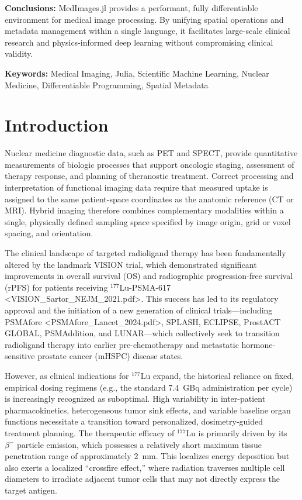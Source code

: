 \documentclass[10pt,letterpaper]{article}
\begin{document}
\textbf{Conclusions:} MedImages.jl provides a performant, fully differentiable environment for medical image processing. By unifying spatial operations and metadata management within a single language, it facilitates large-scale clinical research and physics-informed deep learning without compromising clinical validity.

\textbf{Keywords:} Medical Imaging, Julia, Scientific Machine Learning, Nuclear Medicine, Differentiable Programming, Spatial Metadata

\section{Introduction}

Nuclear medicine diagnostic data, such as PET and SPECT, provide quantitative measurements of biologic processes that support oncologic staging, assessment of therapy response, and planning of theranostic treatment. Correct processing and interpretation of functional imaging data require that measured uptake is assigned to the same patient-space coordinates as the anatomic reference (CT or MRI). Hybrid imaging therefore combines complementary modalities within a single, physically defined sampling space specified by image origin, grid or voxel spacing, and orientation. 

The clinical landscape of targeted radioligand therapy has been fundamentally altered by the landmark VISION trial, which demonstrated significant improvements in overall survival (OS) and radiographic progression-free survival (rPFS) for patients receiving $^{177}$Lu-PSMA-617 <VISION_Sartor_NEJM_2021.pdf>. This success has led to its regulatory approval and the initiation of a new generation of clinical trials—including PSMAfore <PSMAfore_Lancet_2024.pdf>, SPLASH, ECLIPSE, ProstACT GLOBAL, PSMAddition, and LUNAR—which collectively seek to transition radioligand therapy into earlier pre-chemotherapy and metastatic hormone-sensitive prostate cancer (mHSPC) disease states.

However, as clinical indications for $^{177}$Lu expand, the historical reliance on fixed, empirical dosing regimens (e.g., the standard 7.4~GBq administration per cycle) is increasingly recognized as suboptimal. High variability in inter-patient pharmacokinetics, heterogeneous tumor sink effects, and variable baseline organ functions necessitate a transition toward personalized, dosimetry-guided treatment planning. The therapeutic efficacy of $^{177}$Lu is primarily driven by its $\beta^-$ particle emission, which possesses a relatively short maximum tissue penetration range of approximately 2~mm. This localizes energy deposition but also exerts a localized ``crossfire effect,'' where radiation traverses multiple cell diameters to irradiate adjacent tumor cells that may not directly express the target antigen.
\end{document}
